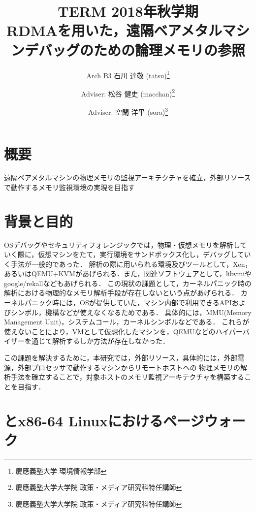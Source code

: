 \documentclass[a4j,10pt]{jsarticle}
\begin{document}

    \title{
        TERM 2018年秋学期 \\
        RDMAを用いた，遠隔ベアメタルマシンデバッグのための論理メモリの参照
    }

    \author{
        Arch B3 石川 達敬 (tatsu)\thanks{慶應義塾大学 環境情報学部}
        \and
        Adviser: 松谷 健史 (macchan)\thanks{慶應義塾大学大学院 政策・メディア研究科特任講師}
        \and
        Adviser: 空閑 洋平 (sora)\thanks{慶應義塾大学大学院 政策・メディア研究科特任講師}
    }

    \maketitle

    \section{概要}

    遠隔ベアメタルマシンの物理メモリの監視アーキテクチャを確立，外部リソースで動作するメモリ監視環境の実現を目指す

    \section{背景と目的}

    OSデバッグやセキュリティフォレンジックでは，物理・仮想メモリを解析していく際に，仮想マシンをたて，実行環境をサンドボックス化し，デバッグしていく手法が一般的であった．
    解析の際に用いられる環境及びツールとして，Xen，あるいはQEMU+KVMがあげられる．また，関連ソフトウェアとして，libvmi\cite{libvmi}やgoogle/rekallなどもあげられる．
    この現状の課題として，カーネルパニック時の解析における物理的なメモリ解析手段が存在しないという点があげられる．
    カーネルパニック時には，OSが提供していた，マシン内部で利用できるAPIおよびシンボル，機構などが使えなくなるためである．
    具体的には，MMU(Memory Management Unit)，システムコール，カーネルシンボルなどである．
    これらが使えないことにより，VMとして仮想化したマシンを，QEMUなどのハイパーバイザーを通じて解析するしか方法が存在しなかった．

    この課題を解決するために，本研究では，外部リソース，具体的には，外部電源，外部プロセッサで動作するマシンからリモートホストへの
    物理メモリの解析手法を確立することで，対象ホストのメモリ監視アーキテクチャを構築することを目指す．

    \section{とx86-64 Linuxにおけるページウォーク}
\end{document}
